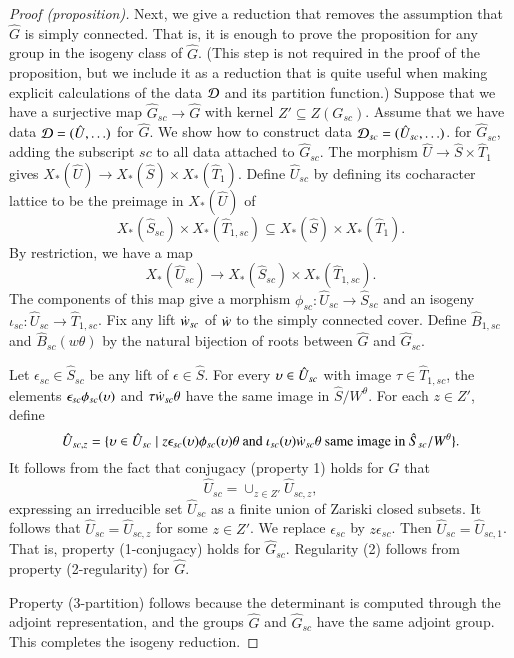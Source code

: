 \begin{proof}[Proof (proposition)]
Next, we give a reduction that removes the assumption that $\hat G$ is
simply connected.  That is, it is enough to prove the proposition for
any group in the isogeny class of $\hat G$.  (This step is not
required in the proof of the proposition, but we include it as a
reduction that is quite useful when making explicit calculations of
the data $\mathcal D$ and its partition function.)  Suppose that we have a
surjective map $\hat G_{sc}\to \hat G$ with kernel $Z' \subseteq
Z(G_{sc})$.  Assume that we have data $\mathcal D=(\hat U,\ldots)$ for $\hat
G$.  We show how to construct data $\mathcal D_{sc}=(\hat U_{sc},\ldots)$. for
$\hat G_{sc}$, adding the subscript ${sc}$ to all data attached to
$\hat G_{sc}$.  The morphism $\hat U \to \hat S\times \hat T_1$ gives
$X_*(\hat U)\to X_*(\hat S)\times X_*(\hat T_1)$.  Define $\hat
U_{sc}$ by defining its cocharacter lattice to be the preimage in
$X_*(\hat U)$ of
\[
X_*(\hat S_{sc})\times X_*(\hat T_{1, sc}) 
\subseteq X_*(\hat S)\times X_*(\hat T_1).
\] 
By restriction, we have a map
\[
X_*(\hat U_{sc})\to X_*(\hat S_{sc}) \times X_*(\hat T_{1,sc}).  
\]
The components of this map give a morphism $\phi_{sc}:\hat
U_{sc}\to\hat S_{sc}$ and an isogeny $\iota_{sc}:\hat U_{sc} \to \hat
T_{1,sc}$.  Fix any lift $\dot w_{sc}$ of $\dot w$ to the simply
connected cover.  Define $\hat B_{1,sc}$ and $\hat B_{sc}(w\theta)$ by
the natural bijection of roots between $\hat G$ and $\hat G_{sc}$.

Let $\epsilon_{sc}\in \hat S_{sc}$ be any lift of $\epsilon\in \hat
S$.  For every $\upsilon\in \hat U_{sc}$ with image $\tau\in \hat
T_{1,sc}$, the elements $\epsilon_{sc}\phi_{sc}(\upsilon)$ and
$\tau\dot w_{sc}\theta$ have the same image in $\hat S/W^\theta$.  For
each $z\in Z'$, define
\[
\hat U_{sc,z} = \{\upsilon \in \hat U_{sc}\mid 
z \epsilon_{sc}(\upsilon)\phi_{sc}(\upsilon)\theta\text{ and }
\iota_{sc}(\upsilon)\dot w_{sc}\theta \text{ same image in } \hat S_{sc}/W^\theta\}.
\]
It follows from the fact that conjugacy (property 1) holds for $\hat
G$ that
\[
\hat U_{sc} = \cup_{z\in Z'} \hat U_{sc,z},
\]
expressing an irreducible set $\hat U_{sc}$ as a finite union of
Zariski closed subsets.  It follows that $\hat U_{sc} = \hat U_{sc,z}$
for some $z\in Z'$.  We replace $\epsilon_{sc}$ by $z\epsilon_{sc}$.
Then $\hat U_{sc} = \hat U_{sc,1}$.  That is, property (1-conjugacy) holds for
$\hat G_{sc}$.  Regularity (2) follows from property (2-regularity)
for $\hat G$.

Property (3-partition) follows because the determinant is computed
through the adjoint representation, and the groups $\hat G$ and $\hat
G_{sc}$ have the same adjoint group.  This completes the isogeny
reduction.


\end{proof}
